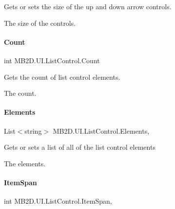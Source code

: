 Gets or sets the size of the up and down arrow controls. 

The size of the controls.\hypertarget{class_m_b2_d_1_1_u_i_1_1_list_control_a231b53abfe2a6040567bb6bc3bf1cee4}{}\label{class_m_b2_d_1_1_u_i_1_1_list_control_a231b53abfe2a6040567bb6bc3bf1cee4} 
\paragraph{\texorpdfstring{Count}{Count}}
{\footnotesize\ttfamily int M\+B2\+D.\+U\+I.\+List\+Control.\+Count\hspace{0.3cm}{\ttfamily [get]}}



Gets the count of list control elements. 

The count.\hypertarget{class_m_b2_d_1_1_u_i_1_1_list_control_a868436cd81ebe891d8748da7b48a7c30}{}\label{class_m_b2_d_1_1_u_i_1_1_list_control_a868436cd81ebe891d8748da7b48a7c30} 
\paragraph{\texorpdfstring{Elements}{Elements}}
{\footnotesize\ttfamily List$<$string$>$ M\+B2\+D.\+U\+I.\+List\+Control.\+Elements\hspace{0.3cm}{\ttfamily [get]}, {\ttfamily [set]}}



Gets or sets a list of all of the list control elements 

The elements.\hypertarget{class_m_b2_d_1_1_u_i_1_1_list_control_a67c7e5b6c19678f4c9d1fd111d87f056}{}\label{class_m_b2_d_1_1_u_i_1_1_list_control_a67c7e5b6c19678f4c9d1fd111d87f056} 
\paragraph{\texorpdfstring{Item\+Span}{ItemSpan}}
{\footnotesize\ttfamily int M\+B2\+D.\+U\+I.\+List\+Control.\+Item\+Span\hspace{0.3cm}{\ttfamily [get]}, {\ttfamily [set]}}



